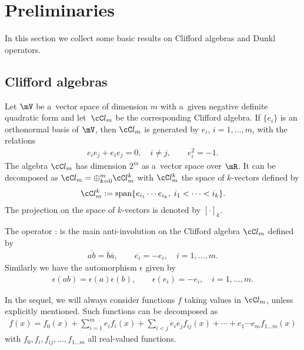 \section{Preliminaries}\label{section2}

In this section we collect some basic results on Clif\/ford algebras and Dunkl operators.

\subsection{Clif\/ford algebras}\label{section2.1}
Let $\mV$ be a~vector space of dimension $m$ with a~given negative def\/inite quadratic form and
let~$\cC l_{m}$ be the corresponding Clif\/ford algebra.
If $\{e_i\}$ is an orthonormal basis of $\mV$, then $\cC l_{m}$ is generated by $e_{i}$, $i=1,
\ldots,m$, with the relations
\begin{gather*} %
e_{i} e_{j} + e_{i} e_{j} = 0, \quad i \neq j,\qquad
 e_{i}^{2} = -1.
\end{gather*}
The algebra $\cC l_{m}$ has dimension $2^{m}$ as a~vector space over $\mR$.
It can be decomposed as $\cC l_{m}=\oplus_{k=0}^{m}\cC l_{m}^{k}$
with $\cC l_{m}^{k}$ the space of $k$-vectors def\/ined by
\begin{gather*}
\cC l_{m}^{k}:=\text{span}\{e_{i_{1}}\cdots e_{i_{k}},\; i_{1}<\cdots<i_{k}\}.
\end{gather*}
The projection on the space of $k$-vectors is denoted by $[\cdot]_{k}$.

The operator $\bar{.}$ is the main anti-involution on the Clif\/ford algebra $\cC l_{m}$ def\/ined by
\begin{gather*}
\overline{a b}=\overline{b}\overline{a},\qquad\overline{e_{i}}=-e_{i},\quad i=1,\ldots,m.
\end{gather*}
Similarly we have the automorphism $\epsilon$ given by
\begin{gather*}
\epsilon(a b)=\epsilon(a)\epsilon(b),\qquad\epsilon(e_{i})=-e_{i},\quad i=1,\ldots,m.
\end{gather*}

In the sequel, we will always consider functions $f$ taking values in $\cC l_{m}$, unless
explicitly mentioned.
Such functions can be decomposed as
\begin{gather*}%
f(x)=f_{0}(x)+\sum_{i=1}^{m}e_{i}f_{i}(x)+\sum_{i<j}e_{i}e_{j}f_{ij}(x)+\cdots+e_{1}
\cdots e_{m}f_{1\ldots m}(x)
\end{gather*}
with $f_{0},f_{i},f_{ij},\ldots,f_{1\ldots m}$ all real-valued functions.

